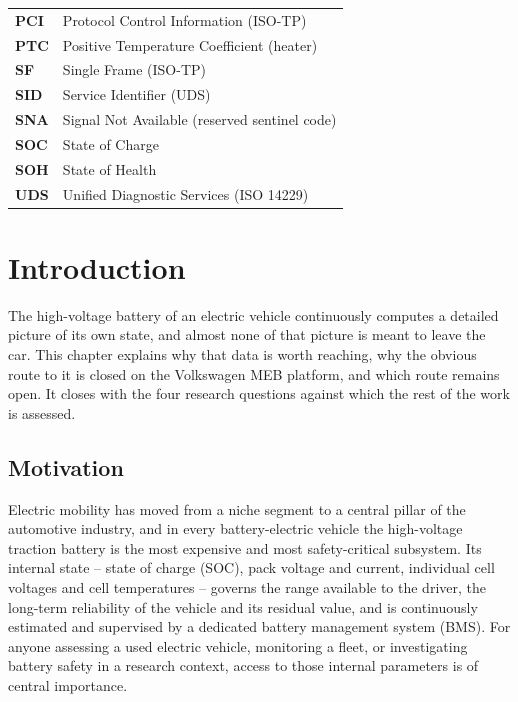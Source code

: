 \documentclass[11pt,a4paper,oneside,parskip=half]{scrreprt}
\begin{document}
\begin{tabular}{@{}lp{10.5cm}@{}}
\textbf{PCI}   & Protocol Control Information (ISO-TP) \\
\textbf{PTC}   & Positive Temperature Coefficient (heater) \\
\textbf{SF}    & Single Frame (ISO-TP) \\
\textbf{SID}   & Service Identifier (UDS) \\
\textbf{SNA}   & Signal Not Available (reserved sentinel code) \\
\textbf{SOC}   & State of Charge \\
\textbf{SOH}   & State of Health \\
\textbf{UDS}   & Unified Diagnostic Services (ISO 14229) \\
\end{tabular}

\clearpage
{}
\setcounter{page}{1}


\chapter{Introduction}
The high-voltage battery of an electric vehicle continuously computes a detailed picture of its own state, and almost none of that picture is meant to leave the car. This chapter explains why that data is worth reaching, why the obvious route to it is closed on the Volkswagen MEB platform, and which route remains open. It closes with the four research questions against which the rest of the work is assessed.

\section{Motivation}
Electric mobility has moved from a niche segment to a central pillar of the automotive industry, and in every battery-electric vehicle the high-voltage traction battery is the most expensive and most safety-critical subsystem. Its internal state -- state of charge (SOC), pack voltage and current, individual cell voltages and cell temperatures -- governs the range available to the driver, the long-term reliability of the vehicle and its residual value, and is continuously estimated and supervised by a dedicated battery management system (BMS). For anyone assessing a used electric vehicle, monitoring a fleet, or investigating battery safety in a research context, access to those internal parameters is of central importance.
\end{document}

